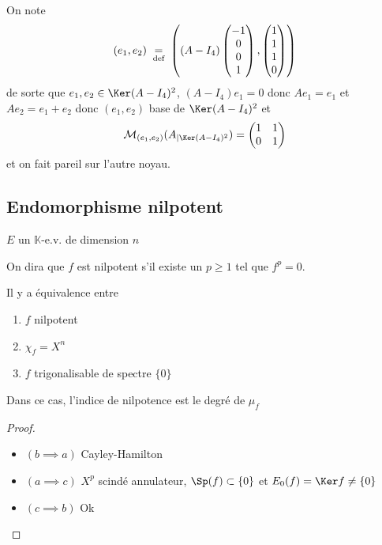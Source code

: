 On note \[
    (e_1, e_2)\;\underset{\text{def}}=\; \left(  (A-I_4)\begin{pmatrix}
        -1\\0\\0\\1
    \end{pmatrix}, \begin{pmatrix}
        1\\1\\1\\0
        \end{pmatrix}\right)
\]
de sorte que $e_1, e_2\in\Ker(A-I_4)^2$, $(A-I_4)e_1=0$ donc $Ae_1=e_1$ et $Ae_2=e_1+e_2$ donc $(e_1, e_2)$ base de $\Ker(A-I_4)^2$
et \[
    \mathcal M_{(e_1, e_2)}(A_{|\Ker(A-I_4)^2})= \begin{pmatrix}
        1&1\\0&1
    \end{pmatrix}
\]
et on fait pareil sur l'autre noyau.

\subsection{Endomorphisme nilpotent}

\begin{defprop}
    \Hyp $E$ un $\mathbb K$-e.v. de dimension $n$
    \begin{concenum}
    \item On dira que $f$ est nilpotent s'il existe un $p\geq 1$ tel que $f^p=0$.
    \item Il y a équivalence entre \begin{enumerate}
        \item $f$ nilpotent
        \item $\chi_f=X^n$
        \item $f$ trigonalisable de spectre $\{0\}$
    \end{enumerate}
    Dans ce cas, l'indice de nilpotence est le degré de $\mu_f$
    \end{concenum}
\end{defprop}

\begin{proof}~
    \begin{itemize}
        \item $(b\implies a)$ Cayley-Hamilton
        \item $(a\implies c)$ $X^p$ scindé annulateur, $\Sp(f)\subset \{0\}$ et $E_0(f)=\Ker f\neq \{0\}$
        \item $(c\implies b)$ Ok
    \end{itemize}
\end{proof}

